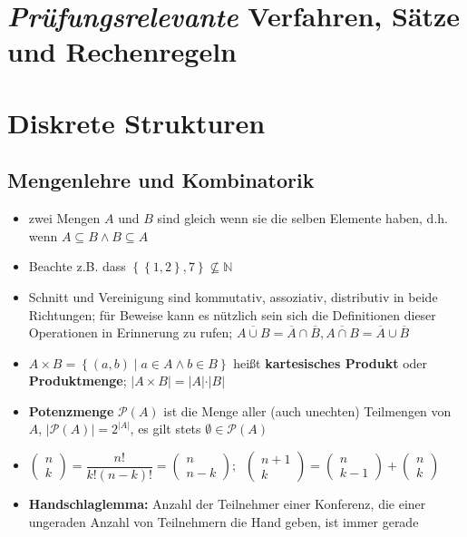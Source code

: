\documentclass[10pt,a4paper]{article}
\begin{document}
\section*{\textit{Prüfungsrelevante} Verfahren, Sätze und Rechenregeln}
\section{Diskrete Strukturen}
\subsection{Mengenlehre und Kombinatorik}
\begin{itemize}
\item zwei Mengen $A$ und $B$ sind gleich wenn sie die selben Elemente haben, d.h. wenn $A \subseteq B \land B \subseteq A$
\item Beachte z.B. dass $\left\lbrace\left\lbrace 1,2\right\rbrace, 7\right\rbrace \nsubseteq \mathbb{N}$
\item Schnitt und Vereinigung sind kommutativ, assoziativ, distributiv in beide Richtungen; für Beweise kann es nützlich sein sich die Definitionen dieser Operationen in Erinnerung zu rufen; $\overline{A\cup B}=\overline{A}\cap \overline{B}, \overline{A\cap B}=\overline{A}\cup \overline{B}$
\item $A\times B=\left\lbrace (a,b)\mid a\in A \land b\in B\right\rbrace$ heißt \textbf{kartesisches Produkt} oder \textbf{Produktmenge};  $\vert A\times B\vert =\vert A\vert \cdot \vert B\vert$
\item \textbf{Potenzmenge} $\mathcal{P}(A)$ ist die Menge aller (auch unechten) Teilmengen von $A$, $\vert \mathcal{P}(A)\vert =2^{\vert A\vert}$, es gilt stets $\emptyset \in \mathcal{P}(A)$
\item $\begin{pmatrix} n\\ k\end{pmatrix}=\dfrac{n!}{k!(n-k)!}=\begin{pmatrix} n\\ n-k\end{pmatrix};\;\;\begin{pmatrix} n+1\\ k\end{pmatrix}=\begin{pmatrix} n\\ k-1\end{pmatrix}+\begin{pmatrix} n\\ k\end{pmatrix}$
\item \textbf{Handschlaglemma:} Anzahl der Teilnehmer einer Konferenz, die einer ungeraden Anzahl von Teilnehmern die Hand geben, ist immer gerade


\end{itemize}
\end{document}
